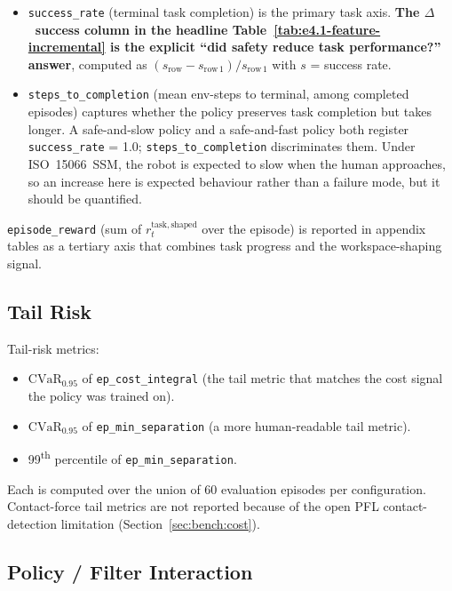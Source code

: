 \documentclass[11pt,a4paper]{report}
\newcommand{\ssm}{SSM}
\newcommand{\pfl}{PFL}
\newcommand{\iso}{ISO~15066}
\newcommand{\cvar}{\ensuremath{\mathrm{CVaR}}}
\begin{document}
\begin{itemize}[topsep=2pt,itemsep=1pt]
\item \texttt{success\_rate} (terminal task completion) is the
  primary task axis. \textbf{The $\Delta$~success column in the
  headline Table~\ref{tab:e4.1-feature-incremental} is the explicit
  ``did safety reduce task performance?'' answer}, computed as
  $(s_{\mathrm{row}} - s_{\mathrm{row\,1}})/s_{\mathrm{row\,1}}$
  with $s$ = success rate.
\item \texttt{steps\_to\_completion} (mean env-steps to terminal,
  among completed episodes) captures whether the policy preserves
  task completion but takes longer. A safe-and-slow policy and a
  safe-and-fast policy both register \texttt{success\_rate} = 1.0;
  \texttt{steps\_to\_completion} discriminates them. Under
  \iso{}~\ssm{}, the robot is expected to slow when the human
  approaches, so an increase here is expected behaviour rather than
  a failure mode, but it should be quantified.
\end{itemize}

\texttt{episode\_reward} (sum of $r^{\mathrm{task,shaped}}_t$ over
the episode) is reported in appendix tables as a tertiary axis
that combines task progress and the workspace-shaping signal.

\subsection{Tail Risk}
\label{sec:setup:metrics:tail}

Tail-risk metrics:
\begin{itemize}[topsep=2pt,itemsep=1pt]
\item $\cvar_{0.95}$ of \texttt{ep\_cost\_integral} (the tail metric
  that matches the cost signal the policy was trained on).
\item $\cvar_{0.95}$ of \texttt{ep\_min\_separation} (a more
  human-readable tail metric).
\item 99\textsuperscript{th} percentile of
  \texttt{ep\_min\_separation}.
\end{itemize}
Each is computed over the union of 60 evaluation episodes per
configuration. Contact-force tail metrics are not reported because
of the open \pfl{} contact-detection limitation
(Section~\ref{sec:bench:cost}).

\subsection{Policy / Filter Interaction}
\label{sec:setup:metrics:interaction}
\end{document}
